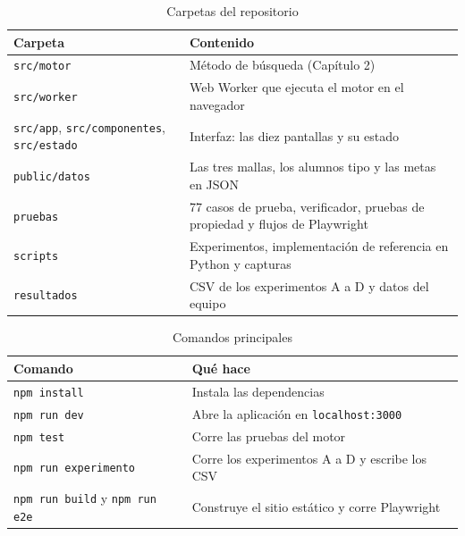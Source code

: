\begin{table}[H]
  \begin{center}
    \caption{Carpetas del repositorio}
    \label{TAB::Carpetas}
    \begin{tabular}{|| p{5cm} | p{8.5cm} ||}
        \hline
        Carpeta & Contenido \\ [0.5ex]
        \hline\hline
        \texttt{src/motor} & Método de búsqueda (Capítulo 2) \\
        \hline
        \texttt{src/worker} & Web Worker que ejecuta el motor en el navegador \\
        \hline
        \texttt{src/app}, \texttt{src/componentes}, \texttt{src/estado} & Interfaz: las diez pantallas y su estado \\
        \hline
        \texttt{public/datos} & Las tres mallas, los alumnos tipo y las metas en JSON \\
        \hline
        \texttt{pruebas} & 77 casos de prueba, verificador, pruebas de propiedad y flujos de Playwright \\
        \hline
        \texttt{scripts} & Experimentos, implementación de referencia en Python y capturas \\
        \hline
        \texttt{resultados} & CSV de los experimentos A a D y datos del equipo \\
        \hline
    \end{tabular}
  \end{center}
\end{table}

\begin{table}[H]
  \begin{center}
    \caption{Comandos principales}
    \label{TAB::Comandos}
    \begin{tabular}{|| l | p{8cm} ||}
        \hline
        Comando & Qué hace \\ [0.5ex]
        \hline\hline
        \texttt{npm install} & Instala las dependencias \\
        \hline
        \texttt{npm run dev} & Abre la aplicación en \texttt{localhost:3000} \\
        \hline
        \texttt{npm test} & Corre las pruebas del motor \\
        \hline
        \texttt{npm run experimento} & Corre los experimentos A a D y escribe los CSV \\
        \hline
        \texttt{npm run build} y \texttt{npm run e2e} & Construye el sitio estático y corre Playwright \\
        \hline
    \end{tabular}
  \end{center}
\end{table}
